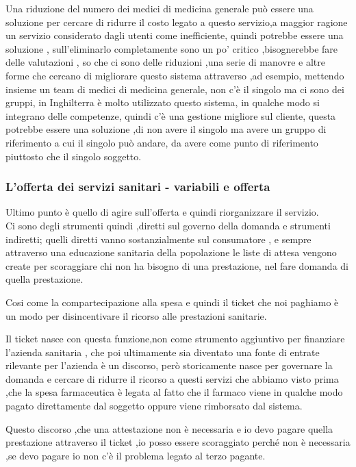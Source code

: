 Una riduzione del numero dei medici di medicina generale può essere una
soluzione per cercare di ridurre il costo legato a questo servizio,a
maggior ragione un servizio considerato dagli utenti come inefficiente,
quindi potrebbe essere una soluzione , sull'eliminarlo completamente
sono un po' critico ,bisognerebbe fare delle valutazioni , so che ci
sono delle riduzioni ,una serie di manovre e altre forme che cercano di
migliorare questo sistema attraverso ,ad esempio, mettendo insieme un
team di medici di medicina generale, non c'è il singolo ma ci sono dei
gruppi, in Inghilterra è molto utilizzato questo sistema, in qualche
modo si integrano delle competenze, quindi c'è una gestione migliore sul
cliente, questa potrebbe essere una soluzione ,di non avere il singolo
ma avere un gruppo di riferimento a cui il singolo può andare, da avere
come punto di riferimento piuttosto che il singolo soggetto.

\subsubsection{L'offerta dei servizi sanitari - variabili e offerta}

Ultimo punto è quello di agire sull'offerta e quindi riorganizzare il
servizio.\\
Ci sono degli strumenti quindi ,diretti sul governo della domanda e
strumenti indiretti; quelli diretti vanno sostanzialmente sul
consumatore , e sempre attraverso una educazione sanitaria della
popolazione le liste di attesa vengono create per scoraggiare chi non ha
bisogno di una prestazione, nel fare domanda di quella prestazione.

Cosi come la compartecipazione alla spesa e quindi il ticket che noi
paghiamo è un modo per disincentivare il ricorso alle prestazioni
sanitarie.

Il ticket nasce con questa funzione,non come strumento aggiuntivo per
finanziare l'azienda sanitaria , che poi ultimamente sia diventato una
fonte di entrate rilevante per l'azienda è un discorso, però
storicamente nasce per governare la domanda e cercare di ridurre il
ricorso a questi servizi che abbiamo visto prima ,che la spesa
farmaceutica è legata al fatto che il farmaco viene in qualche modo
pagato direttamente dal soggetto oppure viene rimborsato dal sistema.

Questo discorso ,che una attestazione non è necessaria e io devo pagare
quella prestazione attraverso il ticket ,io posso essere scoraggiato
perché non è necessaria ,se devo pagare io non c'è il problema legato al
terzo pagante.

